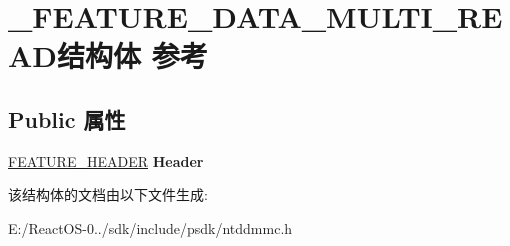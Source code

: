 \hypertarget{struct___f_e_a_t_u_r_e___d_a_t_a___m_u_l_t_i___r_e_a_d}{}\section{\+\_\+\+F\+E\+A\+T\+U\+R\+E\+\_\+\+D\+A\+T\+A\+\_\+\+M\+U\+L\+T\+I\+\_\+\+R\+E\+A\+D结构体 参考}
\label{struct___f_e_a_t_u_r_e___d_a_t_a___m_u_l_t_i___r_e_a_d}
\subsection*{Public 属性}
\begin{DoxyCompactItemize}
\item 
\mbox{\label{struct___f_e_a_t_u_r_e___d_a_t_a___m_u_l_t_i___r_e_a_d_a2e71e6316365cf4dbb3df2cdc1b9c34f}} 
\hyperlink{struct___f_e_a_t_u_r_e___h_e_a_d_e_r}{F\+E\+A\+T\+U\+R\+E\+\_\+\+H\+E\+A\+D\+ER} {\bfseries Header}
\end{DoxyCompactItemize}


该结构体的文档由以下文件生成\+:\begin{DoxyCompactItemize}
\item 
E\+:/\+React\+O\+S-\/0../sdk/include/psdk/ntddmmc.\+h\end{DoxyCompactItemize}
